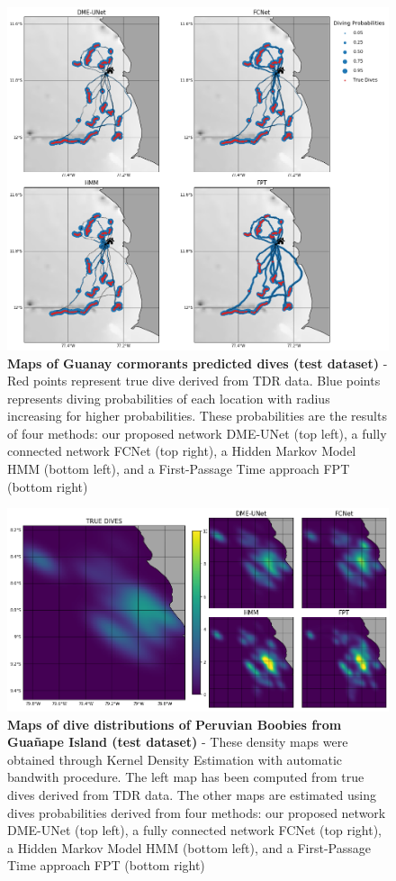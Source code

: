 \documentclass{article}
\begin{document}
\begin{figure}[h]
  \centering
  \includegraphics[scale=0.5]{figure4b.png}
  \caption{\textbf{Maps of Guanay cormorants predicted dives (test dataset)} - Red points represent true dive derived from TDR data. Blue points represents diving probabilities of each location with radius increasing for higher probabilities. These probabilities are the results of four methods: our proposed network DME-UNet (top left), a fully connected network FCNet (top right), a Hidden Markov Model HMM (bottom left), and a First-Passage Time approach FPT (bottom right)}
  \label{figure4b}
\end{figure}

\begin{figure}[h]
  \centering
  \includegraphics[scale=0.5]{figure5.png}
  \caption{\textbf{Maps of dive distributions of Peruvian Boobies from Gua\~nape  Island (test dataset)} - These density maps were obtained through Kernel Density Estimation with automatic bandwith procedure. The left map has been computed from true dives derived from TDR data. The other maps are estimated using dives probabilities derived from four methods: our proposed network DME-UNet (top left), a fully connected network FCNet (top right), a Hidden Markov Model HMM (bottom left), and a First-Passage Time approach FPT (bottom right)}
  \label{figure5}
\end{figure}
\end{document}
